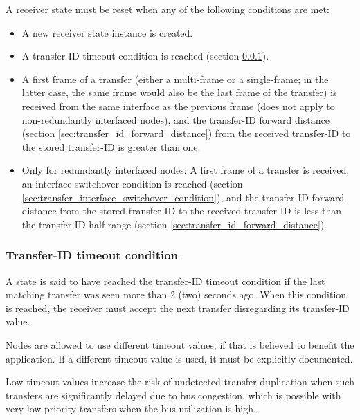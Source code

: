A receiver state must be reset when any of the following conditions are met:

\begin{itemize}
    \item A new receiver state instance is created.

    \item A transfer-ID timeout condition is reached (section \ref{sec:transfer_id_timeout_condition}).

    \item A first frame of a transfer (either a multi-frame or a single-frame; in the latter case, the same frame
    would also be the last frame of the transfer) is received from the same interface as the previous frame
    (does not apply to non-redundantly interfaced nodes),
    and the transfer-ID forward distance (section \ref{sec:transfer_id_forward_distance}) from the received
    transfer-ID to the stored transfer-ID is greater than one.

    \item Only for redundantly interfaced nodes: A first frame of a transfer is received,
    an interface switchover condition is reached (section \ref{sec:transfer_interface_switchover_condition}),
    and the transfer-ID forward distance from the stored transfer-ID to the received transfer-ID is
    less than the transfer-ID half range (section \ref{sec:transfer_id_forward_distance}).
\end{itemize}

\subsubsection{Transfer-ID timeout condition}\label{sec:transfer_id_timeout_condition}

A state is said to have reached the transfer-ID timeout condition
if the last matching transfer was seen more than 2 (two) seconds ago.
When this condition is reached, the receiver must accept the next transfer disregarding its transfer-ID value.

Nodes are allowed to use different timeout values, if that is believed to benefit the application.
If a different timeout value is used, it must be explicitly documented.

Low timeout values increase the risk of undetected transfer duplication when such transfers are significantly
delayed due to bus congestion, which is possible with very low-priority transfers when the bus utilization is high.

